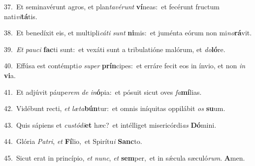 {\numbfont\textcolor{\numbcolor}{37.}}~Et seminavérunt agros, et plan\-\textit{ta}\-\textit{vé}\textit{runt} \textbf{ví}\-neas:~\star et fecérunt fructum nati\-\textit{vi}\-\textbf{tá}tis.\par
{\numbfont\textcolor{\numbcolor}{38.}}~Et benedíxit eis, et multipli\-\textit{cá}\-\textit{ti} \textit{sunt} \textbf{ni}\-mis:~\star et juménta eórum non mi\-\textit{no}\-\textbf{rá}vit.\par
{\numbfont\textcolor{\numbcolor}{39.}}~\textit{Et} \textit{pau}\-\textit{ci} \textbf{fac}\-ti sunt:~\star et vexáti sunt a tribulatióne malórum, et \textit{do}\-\textbf{ló}re.\par
{\numbfont\textcolor{\numbcolor}{40.}}~Effúsa est contémpti\textit{o} \textit{su}\-\textit{per} \textbf{prín}\-cipes:~\star et erráre fecit eos in ínvio, et non \textit{in} \textbf{vi}\-a.\par
{\numbfont\textcolor{\numbcolor}{41.}}~Et adjúvit páupe\textit{rem} \textit{de} \textit{in}\-\textbf{ó}pia:~\star et pósuit sicut oves \textit{fa}\-\textbf{mí}lias.\par
{\numbfont\textcolor{\numbcolor}{42.}}~Vidébunt recti, \textit{et} \textit{læ}\-\textit{ta}\textbf{bún}tur:~\star et omnis iníquitas oppilábit \textit{os} \textbf{su}\-um.\par
{\numbfont\textcolor{\numbcolor}{43.}}~Quis sápiens et \textit{cus}\-\textit{tó}\textit{di}\textbf{et} hæc?~\star et intélliget misericórdi\textit{as} \textbf{Dó}\-mini.\par
{\numbfont\textcolor{\numbcolor}{44.}}~Glória \textit{Pa}\-\textit{tri}, \textit{et} \textbf{Fí}\-lio,~\star et Spirítu\textit{i} \textbf{Sanc}\-to.\par
{\numbfont\textcolor{\numbcolor}{45.}}~Sicut erat in princípio, \textit{et} \textit{nunc}\-, \textit{et} \textbf{sem}\-per,~\star et in sǽcula sæculó\-\textit{rum}\-. \textbf{A}\-men.\par
